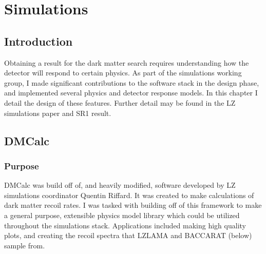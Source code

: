 \chapter{Simulations}
\label{chap:sims}
\section{Introduction}

Obtaining a result for the dark matter search requires understanding how the detector will respond to certain physics.
As part of the simulations working group, I made significant contributions to the software stack in the design phase, and implemented several physics and detector response models.
In this chapter I detail the design of these features.
Further detail may be found in the LZ simulations paper\cite{akerib_simulations_2021} and SR1 result\cite{aalbers_first_2022}.

\section {DMCalc}
\subsection{Purpose}
DMCalc was build off of, and heavily modified, software developed by LZ simulations coordinator Quentin Riffard.
It was created to make calculations of dark matter recoil rates.
I was tasked with building off of this framework to make a general purpose, extensible physics model library which could be utilized throughout the simulations stack.
Applications included making high quality plots, and creating the recoil spectra that LZLAMA and BACCARAT (below) sample from.

